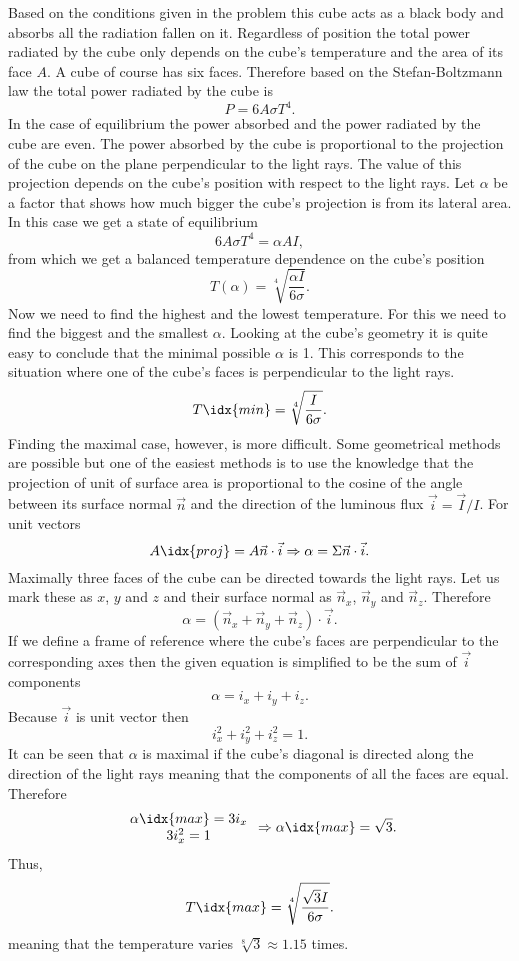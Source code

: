 \solueng
Based on the conditions given in the problem this cube acts as a black body and absorbs all the radiation fallen on it. Regardless of position the total power radiated by the cube only depends on the cube’s temperature and the area of its face $A$. A cube of course has six faces. Therefore based on the Stefan-Boltzmann law the total power radiated by the cube is
$$
P=6A\sigma T^4 .
$$
In the case of equilibrium the power absorbed and the power radiated by the cube are even. The power absorbed by the cube is proportional to the projection of the cube on the plane perpendicular to the light rays. The value of this projection depends on the cube’s position with respect to the light rays. Let $\alpha$ be a factor that shows how much bigger the cube’s projection is from its lateral area. In this case we get a state of equilibrium 
$$
6A\sigma T^4=\alpha AI,
$$
from which we get a balanced temperature dependence on the cube’s position
$$
T(\alpha)=\sqrt[4]{\frac{\alpha I}{6\sigma}}.
$$
Now we need to find the highest and the lowest temperature. For this we need to find the biggest and the smallest $\alpha$. Looking at the cube’s geometry it is quite easy to conclude that the minimal possible $\alpha$ is 1. This corresponds to the situation where one of the cube’s faces is perpendicular to the light rays. 
$$
T\idx{min}=\sqrt[4]{\frac{ I}{6\sigma}}.
$$
Finding the maximal case, however, is more difficult. Some geometrical methods are possible but one of the easiest methods is to use the knowledge that the projection of unit of surface area is proportional to the cosine of the angle between its surface normal $\vec{n}$ and the direction of the luminous flux $\vec{i}=\vec{I}/I$. For unit vectors
$$
A\idx{proj}=A\vec{n}\cdot\vec{i} \Rightarrow \alpha=\Sigma\vec{n}\cdot\vec{i}.
$$
Maximally three faces of the cube can be directed towards the light rays. Let us mark these as $x$, $y$ and $z$ and their surface normal as $\vec{n}_x$, $\vec{n}_y$ and $\vec{n}_z$. Therefore
$$
\alpha= (\vec{n}_x + \vec{n}_y + \vec{n}_z) \cdot \vec{i}.
$$
If we define a frame of reference where the cube’s faces are perpendicular to the corresponding axes then the given equation is simplified to be the sum of $\vec{i}$ components
$$
\alpha = i_x + i_y + i_z.
$$
Because $\vec{i}$ is unit vector then
$$
i_x^2+i_y^2+i_z^2=1.
$$
It can be seen that $\alpha$ is maximal if the cube’s diagonal is directed along the direction of the light rays meaning that the components of all the faces are equal. Therefore
$$
\begin{array}{c} 
\alpha\idx{max} = 3i_x  \\ 3i_x^2=1  
\end{array}
\Rightarrow \alpha\idx{max}=\sqrt{3}.
$$
Thus,
$$
T\idx{max}=\sqrt[4]{\frac{\sqrt{3} I}{6\sigma}}.
$$
meaning that the temperature varies $\sqrt[8]{3} \approx 1.15$ times.
\probend